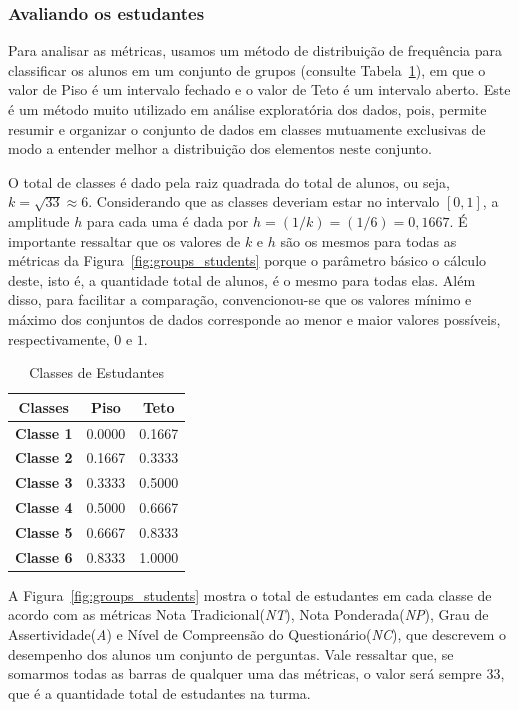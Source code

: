 \subsubsection{Avaliando os estudantes}
Para analisar as métricas, usamos um método de distribuição de frequência para classificar os alunos em um conjunto de grupos (consulte Tabela~\ref{tab:Groups}), em que o valor de Piso é um intervalo fechado e o valor de Teto é um intervalo aberto. Este é um método muito utilizado em análise exploratória dos dados, pois, permite resumir e organizar o conjunto de dados em classes mutuamente exclusivas de modo a entender melhor a distribuição dos elementos neste conjunto.

O total de classes é dado pela raiz quadrada do total de alunos, ou seja, $k = \sqrt{33} \approx 6$. Considerando que as classes deveriam estar no intervalo $[0,1]$, a amplitude $h$ para cada uma é dada por $h = (1/k) = (1/6) = 0,1667$. É importante ressaltar que os valores de $k$ e $h$ são os mesmos para todas as métricas da Figura~\ref{fig:groups_students} porque o parâmetro básico o cálculo deste, isto é, a quantidade total de alunos, é o mesmo para todas elas. Além disso, para facilitar a comparação, convencionou-se que os valores mínimo e máximo dos conjuntos de dados corresponde ao menor e maior valores possíveis, respectivamente, $0$ e $1$.

\begin{table}[htbp]
\caption{Classes de Estudantes}
\centering
\begin{tabular}{|c|c|c|}
\hline
\multicolumn{1}{|c|}{\textbf{Classes}} & \multicolumn{1}{c|}{\textbf{Piso}} & \multicolumn{1}{c|}{\textbf{Teto}} \\ \hline
\textbf{Classe 1} & 0.0000 & 0.1667 \\ \hline
\textbf{Classe 2} & 0.1667 & 0.3333 \\ \hline
\textbf{Classe 3} & 0.3333 & 0.5000 \\ \hline
\textbf{Classe 4} & 0.5000 & 0.6667 \\ \hline
\textbf{Classe 5} & 0.6667 & 0.8333 \\ \hline
\textbf{Classe 6} & 0.8333 & 1.0000 \\ \hline
\end{tabular}
\label{tab:Groups}
\end{table}

A Figura~\ref{fig:groups_students} mostra o total de estudantes em cada classe de acordo com as métricas Nota Tradicional(\textit{NT}), Nota Ponderada(\textit{NP}), Grau de Assertividade(\textit{A}) e Nível de Compreensão do Questionário(\textit{NC}), que descrevem o desempenho dos alunos um conjunto de perguntas. Vale ressaltar que, se somarmos todas as barras de qualquer uma das métricas, o valor será sempre 33, que é a quantidade total de estudantes na turma.

